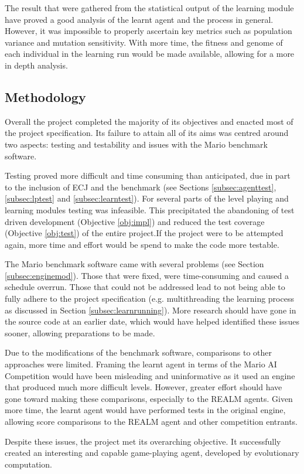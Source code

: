 The result that were gathered from the statistical output of the learning module have proved a good analysis of the learnt agent and the process in general. However, it was impossible to properly ascertain key metrics such as population variance and mutation sensitivity. With more time, the fitness and genome of each individual in the learning run would be made available, allowing for a more in depth analysis.



\subsection{Methodology}

Overall the project completed the majority of its objectives and enacted most of the project specification. Its failure to attain all of its aims was centred around two aspects: testing and testability and issues with the Mario benchmark software.

Testing proved more difficult and time consuming than anticipated, due in part to the inclusion of ECJ and the benchmark (see Sections \ref{subsec:agenttest}, \ref{subsec:lptest} and \ref{subsec:learntest}). For several parts of the level playing and learning modules testing was infeasible. This precipitated the abandoning of test driven development (Objective \ref{obj:impl}) and reduced the test coverage (Objective \ref{obj:test}) of the entire project.If the project were to be attempted again, more time and effort would be spend to make the code more testable.

The Mario benchmark software came with several problems (see Section \ref{subsec:enginemod}). Those that were fixed, were time-consuming and caused a schedule overrun. Those that could not be addressed lead to not being able to fully adhere to the project specification (e.g. multithreading the learning process as discussed in Section \ref{subsec:learnrunning}). More research should have gone in the source code at an earlier date, which would have helped identified these issues sooner, allowing preparations to be made.

Due to the modifications of the benchmark software, comparisons to other approaches were limited. Framing the learnt agent in terms of the Mario AI Competition would have been misleading and uninformative as it used an engine that produced much more difficult levels. However, greater effort should have gone toward making these comparisons, especially to the REALM agents. Given more time, the learnt agent would have performed tests in the original engine, allowing score comparisons to the REALM agent and other competition entrants.

Despite these issues, the project met its overarching objective. It successfully created an interesting and capable game-playing agent, developed by evolutionary computation.





